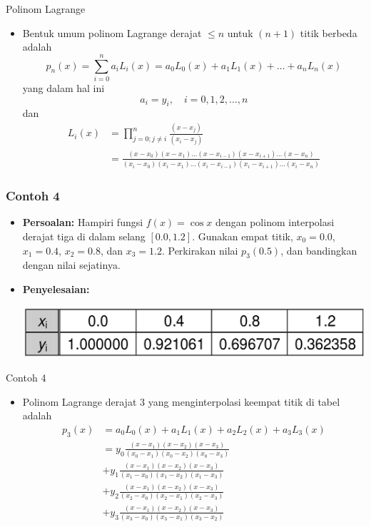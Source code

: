 \documentclass[pdflatex,compress,mathserif]{beamer}
\begin{document}
\begin{frame}{Polinom Lagrange}
	\begin{itemize}
		\item Bentuk umum polinom Lagrange derajat $ \leq  n $ untuk $ (n + 1) $ titik berbeda adalah
		\begin{equation}\label{pol.lagr}
			p_n(x) = \sum_{i=0}^{n} a_i L_i(x) = a_0 L_0(x) + a_1 L_1(x) + \dots + a_n L_n(x)
		\end{equation}
		yang dalam hal ini
		\[ a_i = y_i,\quad i=0,1,2,\dots,n \]
		dan
		\begin{align*}
			L_i(x) &= \prod_{j=0;j\neq i}^{n} \frac{(x-x_j)}{(x_i-x_j)} \\
			&= \frac{(x-x_0)(x-x_1) \dots (x-x_{i-1})(x-x_{i+1})\dots (x-x_n)}{(x_i -x_0)(x_i-x_1) \dots (x_i-x_{i-1})(x_i-x_{i+1})\dots (x_i-x_n)}
		\end{align*}
	\end{itemize}
\end{frame}

\begin{frame}
	\frametitle{Contoh 4}
	\begin{itemize}
		\item \textbf{Persoalan:} Hampiri fungsi $ f(x) = \cos x $ dengan polinom interpolasi derajat tiga di dalam selang $ [0.0, 1.2] $. Gunakan empat titik, $ x_0 = 0.0 $, $ x_1 = 0.4 $, $ x_2 = 0.8 $, dan $ x_3 = 1.2 $. Perkirakan nilai $ p_3(0.5) $, dan bandingkan dengan nilai sejatinya.
		\item \textbf{Penyelesaian:}
		\begin{center}
			\includegraphics[width=0.7\linewidth]{img/img08}
		\end{center}
	\end{itemize}
\end{frame}

\begin{frame}{Contoh 4}
	\begin{itemize}
		\item Polinom Lagrange derajat 3 yang menginterpolasi keempat titik di tabel adalah
		\begin{align*}
			p_3 (x) &= a_0 L_0 (x) + a_1 L_1 (x) + a_2 L_2 (x) + a_3 L_3 (x) \\
			&= y_0 \frac{(x-x_1)(x-x_2)(x-x_3)}{(x_0-x_1)(x_0-x_2)(x_0-x_3)} \\
			&+ y_1 \frac{(x-x_1)(x-x_2)(x-x_3)}{(x_1-x_0)(x_1-x_2)(x_1-x_3)} \\
			&+ y_2 \frac{(x-x_1)(x-x_2)(x-x_3)}{(x_2-x_0)(x_2-x_1)(x_2-x_3)} \\
			&+ y_3 \frac{(x-x_1)(x-x_2)(x-x_3)}{(x_3-x_0)(x_3-x_1)(x_3-x_2)} \\
		\end{align*}
	\end{itemize}
\end{frame}
\end{document}
